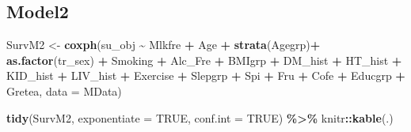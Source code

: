 \documentclass[
]{article}
\newenvironment{Shaded}{\begin{snugshade}}{\end{snugshade}}
\newcommand{\DataTypeTok}[1]{\textcolor[rgb]{0.13,0.29,0.53}{#1}}
\newcommand{\KeywordTok}[1]{\textcolor[rgb]{0.13,0.29,0.53}{\textbf{#1}}}
\newcommand{\NormalTok}[1]{#1}
\newcommand{\OperatorTok}[1]{\textcolor[rgb]{0.81,0.36,0.00}{\textbf{#1}}}
\newcommand{\OtherTok}[1]{\textcolor[rgb]{0.56,0.35,0.01}{#1}}
\newcommand{\StringTok}[1]{\textcolor[rgb]{0.31,0.60,0.02}{#1}}
\begin{document}
\hypertarget{model2}{%
\subsection{Model2}\label{model2}}

\begin{Shaded}
\begin{Highlighting}[]
\NormalTok{SurvM2 \textless{}{-}}\StringTok{  }\KeywordTok{coxph}\NormalTok{(su\_obj }\OperatorTok{\textasciitilde{}}\StringTok{ }\NormalTok{Mlkfre }\OperatorTok{+}\StringTok{ }\NormalTok{Age }\OperatorTok{+}\StringTok{ }\KeywordTok{strata}\NormalTok{(Agegrp)}\OperatorTok{+}\StringTok{ }\KeywordTok{as.factor}\NormalTok{(tr\_sex) }\OperatorTok{+}\StringTok{ }\NormalTok{Smoking }\OperatorTok{+}\StringTok{ }\NormalTok{Alc\_Fre }\OperatorTok{+}\StringTok{ }
\StringTok{                   }\NormalTok{BMIgrp }\OperatorTok{+}\StringTok{ }\NormalTok{DM\_hist }\OperatorTok{+}\StringTok{ }\NormalTok{HT\_hist }\OperatorTok{+}\StringTok{ }\NormalTok{KID\_hist }\OperatorTok{+}\StringTok{ }\NormalTok{LIV\_hist }\OperatorTok{+}\StringTok{ }\NormalTok{Exercise }\OperatorTok{+}\StringTok{ }
\StringTok{                   }\NormalTok{Slepgrp }\OperatorTok{+}\StringTok{ }\NormalTok{Spi }\OperatorTok{+}\StringTok{ }\NormalTok{Fru }\OperatorTok{+}\StringTok{ }\NormalTok{Cofe }\OperatorTok{+}\StringTok{ }\NormalTok{Educgrp }\OperatorTok{+}\StringTok{ }\NormalTok{Gretea, }
                 \DataTypeTok{data =}\NormalTok{ MData)}

\KeywordTok{tidy}\NormalTok{(SurvM2, }\DataTypeTok{exponentiate =} \OtherTok{TRUE}\NormalTok{, }\DataTypeTok{conf.int =} \OtherTok{TRUE}\NormalTok{) }\OperatorTok{\%\textgreater{}\%}\StringTok{ }
\StringTok{  }\NormalTok{knitr}\OperatorTok{::}\KeywordTok{kable}\NormalTok{(.)}
\end{Highlighting}
\end{Shaded}
\end{document}
